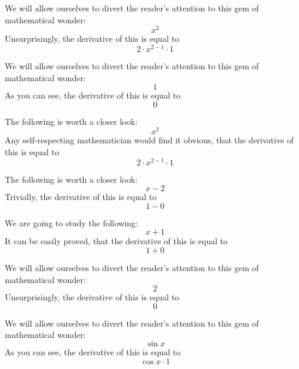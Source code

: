 \documentclass{article}
\begin{document}
We will allow ourselves to divert the reader's attention to this gem of mathematical wonder:
\begin{equation}
x ^{2 } 
\end{equation}
Unsurprisingly, the derivative of this is equal to
\begin{equation}
2 \cdot x ^{2 - 1 } \cdot 1 
\end{equation}

We will allow ourselves to divert the reader's attention to this gem of mathematical wonder:
\begin{equation}
1 
\end{equation}
As you can see, the derivative of this is equal to
\begin{equation}
0 
\end{equation}

The following is worth a closer look:
\begin{equation}
x ^{2 } 
\end{equation}
Any self-respecting mathematician would find it obvious, that the derivative of this is equal to
\begin{equation}
2 \cdot x ^{2 - 1 } \cdot 1 
\end{equation}

The following is worth a closer look:
\begin{equation}
x - 2 
\end{equation}
Trivially, the derivative of this is equal to
\begin{equation}
1 - 0 
\end{equation}

We are going to study the following:
\begin{equation}
x + 1 
\end{equation}
It can be easily proved, that the derivative of this is equal to
\begin{equation}
1 + 0 
\end{equation}

We will allow ourselves to divert the reader's attention to this gem of mathematical wonder:
\begin{equation}
2 
\end{equation}
Unsurprisingly, the derivative of this is equal to
\begin{equation}
0 
\end{equation}

We will allow ourselves to divert the reader's attention to this gem of mathematical wonder:
\begin{equation}
\sin x 
\end{equation}
As you can see, the derivative of this is equal to
\begin{equation}
\cos x \cdot 1 
\end{equation}
\end{document}
